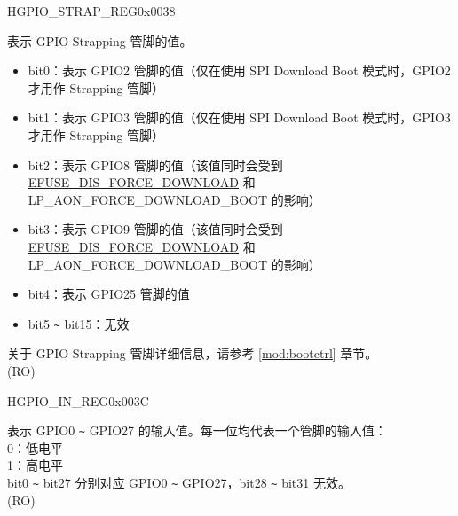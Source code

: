 \begin{register}{H}{GPIO\_STRAP\_REG}{0x0038}\label{regdesc:GPIOSTRAPREG}
%
%
\regnewline%
\begin{regdesc}\begin{reglist}
\label{fielddesc:GPIOSTRAPPING}\item [GPIO\_STRAPPING] 表示 GPIO Strapping 管脚的值。
\begin{itemize}
    \item bit0：表示 GPIO2 管脚的值（仅在使用 SPI Download Boot 模式时，GPIO2 才用作 Strapping 管脚）
    \item bit1：表示 GPIO3 管脚的值（仅在使用 SPI Download Boot 模式时，GPIO3 才用作 Strapping 管脚）
    \item bit2：表示 GPIO8 管脚的值（该值同时会受到 \hyperref[fielddesc:EFUSEDISFORCEDOWNLOAD]{EFUSE\_DIS\_FORCE\_DOWNLOAD} 和 LP\_AON\_FORCE\_DOWNLOAD\_BOOT 的影响）
    \item bit3：表示 GPIO9 管脚的值（该值同时会受到 \hyperref[fielddesc:EFUSEDISFORCEDOWNLOAD]{EFUSE\_DIS\_FORCE\_DOWNLOAD} 和 LP\_AON\_FORCE\_DOWNLOAD\_BOOT 的影响）
    \item bit4：表示 GPIO25 管脚的值
    \item bit5 \verb+~+ bit15：无效
\end{itemize}
关于 GPIO Strapping 管脚详细信息，请参考 \ref{mod:bootctrl} \textit{} 章节。\\
(RO)
\end{reglist}\end{regdesc}
\end{register}


\begin{register}{H}{GPIO\_IN\_REG}{0x003C}\label{regdesc:GPIOINREG}
%
\regnewline%
\begin{regdesc}\begin{reglist}
\label{fielddesc:GPIOINDATANEXT}\item [GPIO\_IN\_DATA\_NEXT] 表示 GPIO0 \verb+~+ GPIO27 的输入值。每一位均代表一个管脚的输入值：\\
0：低电平 \\
1：高电平 \\
bit0 \verb+~+ bit27 分别对应 GPIO0 \verb+~+ GPIO27，bit28 \verb+~+ bit31 无效。\\
(RO)
\end{reglist}\end{regdesc}
\end{register}


